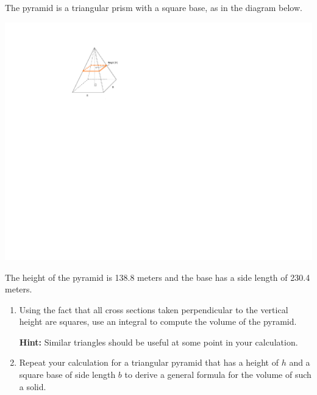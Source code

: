 \documentclass[12pt]{article}
\newif\ifans
\begin{document}
\begin{enumerate}
The pyramid is a triangular prism with a square base, as in the diagram below.  

\begin{center}
\includegraphics[scale=1.5]{pyramid.pdf}
\end{center}

The height of the pyramid is 138.8 meters and the base has a side length of 230.4 meters.  

\begin{enumerate} 

\item Using the fact that all cross sections taken perpendicular to the vertical height are squares, use an integral to compute the volume of the pyramid.

{\bf Hint:} Similar triangles should be useful at some point in your calculation.

\ifans{\fbox{$V\approx2,456,027$ square meters}} \fi

\item Repeat your calculation for a triangular pyramid that has a height of $h$ and a square base of side length $b$ to derive a general formula for the volume of such a solid.

\ifans{\fbox{$V=\int_0^h \left(\frac{h}{b}z\right)^2 \,dz=\frac{1}{3}b^2h$}} \fi

\end{enumerate}

\end{enumerate}
\end{document}

